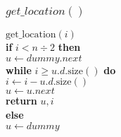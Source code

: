 \documentclass{beamer}
\begin{document}
\begin{frame}[shrink]
\frametitle{$get\_location()$}
\begin{oframed}
\begin{flushleft}
\hspace*{1em} \ensuremath{\mathrm{get\_location}(\ensuremath{\mathit{i}})}\\
\hspace*{1em} \hspace*{1em} {\color{black} \textbf{if}} \ensuremath{\ensuremath{\mathit{i}} < \ensuremath{\mathit{n}}\div 2} {\color{black} \textbf{then}} \\
\hspace*{1em} \hspace*{1em} \hspace*{1em} \ensuremath{\ensuremath{\mathit{u}} \gets  \ensuremath{\ensuremath{\mathit{dummy}}.next}}\\
\hspace*{1em} \hspace*{1em} \hspace*{1em} {\color{black} \textbf{while}} \ensuremath{\ensuremath{\mathit{i}} \ge \ensuremath{\mathit{u}}.\ensuremath{\mathit{d}}.\mathrm{size}()} {\color{black} \textbf{do}} \\
\hspace*{1em} \hspace*{1em} \hspace*{1em} \hspace*{1em} \ensuremath{\ensuremath{\mathit{i}} \gets  \ensuremath{\ensuremath{\mathit{i}} - \ensuremath{\mathit{u}}.\ensuremath{\mathit{d}}.\mathrm{size}()}}\\
\hspace*{1em} \hspace*{1em} \hspace*{1em} \hspace*{1em} \ensuremath{\ensuremath{\mathit{u}} \gets  \ensuremath{\ensuremath{\mathit{u}}.next}}\\
\hspace*{1em} \hspace*{1em} \hspace*{1em} {\color{black} \textbf{return}} \ensuremath{\ensuremath{\mathit{u}},\ensuremath{\mathit{i}}}\\
\hspace*{1em} \hspace*{1em} {\color{black} \textbf{else}} \\
\hspace*{1em} \hspace*{1em} \hspace*{1em} \ensuremath{\ensuremath{\mathit{u}} \gets  \ensuremath{dummy}}\\

\end{flushleft}
\end{oframed}
\end{frame}
\end{document}
